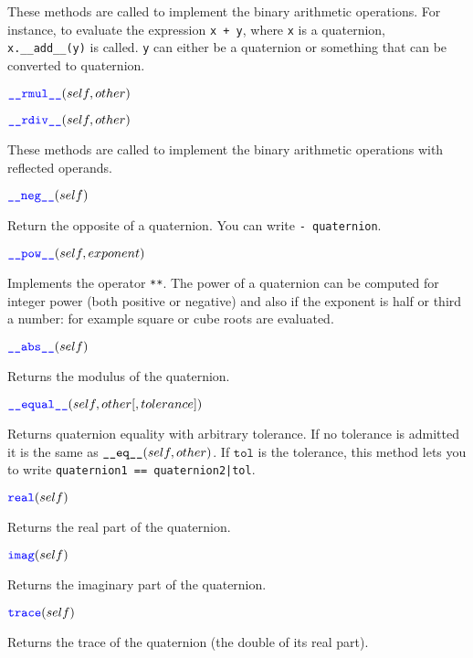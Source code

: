 \documentclass[11pt]{paper}
\begin{document}
These methods are called to implement the binary arithmetic operations. For instance, to evaluate the expression \texttt{x + y}, where \texttt{x} is a quaternion, \texttt{x.\_\_\mbox{add}\_\_(y)} is called. \texttt{y} can either be a quaternion or something that can be converted to quaternion.


\medskip
\noindent $\textcolor{blue}{\texttt{\_\_\mbox{rmul}\_\_}}(self,other)$ 

\noindent $\textcolor{blue}{\texttt{\_\_\mbox{rdiv}\_\_}}(self,other)$

These methods are called to implement the binary arithmetic operations with reflected operands.


\medskip        
\noindent $\textcolor{blue}{\texttt{\_\_\mbox{neg}\_\_}}(self)$

Return the opposite of a quaternion. You can write \texttt{- quaternion}.


\medskip
\noindent $\textcolor{blue}{\texttt{\_\_\mbox{pow}\_\_}}(self,exponent)$

Implements the operator \texttt{**}. The power of a quaternion can be computed for integer power (both positive or negative) and also if the exponent is half or third a number: for example square or cube roots are evaluated.

\medskip
\noindent $\textcolor{blue}{\texttt{\_\_\mbox{abs}\_\_}}(self)$ 

Returns the modulus of the quaternion.

\pagebreak

\medskip
\noindent $\textcolor{blue}{\texttt{\_\_\mbox{equal}\_\_}}(self,other[,tolerance])$ 

Returns quaternion equality with arbitrary tolerance. If no tolerance is admitted it is the same as $\texttt{\_\_\mbox{eq}\_\_}(self,other)$. If $\texttt{tol}$ is the tolerance, this method lets you to write \texttt{quaternion1 == quaternion2|tol}.

\medskip
\noindent $\textcolor{blue}{\texttt{\mbox{real}}}(self)$ 

Returns the real part of the quaternion.

\medskip
\noindent $\textcolor{blue}{\texttt{\mbox{imag}}}(self)$ 

Returns the imaginary part of the quaternion.

\medskip
\noindent $\textcolor{blue}{\texttt{\mbox{trace}}}(self)$ 

Returns the trace of the quaternion (the double of its real part).
\end{document}
